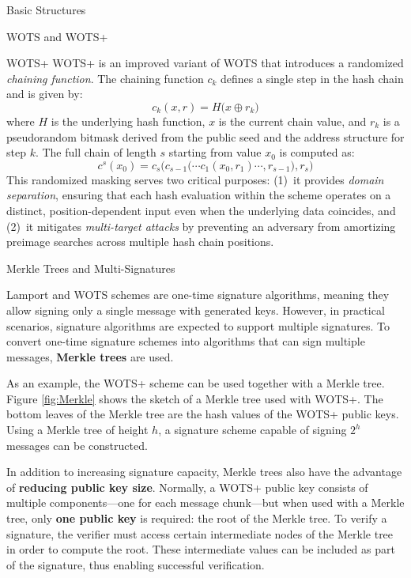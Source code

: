 \documentclass[version=preprint]{iacrcc}
\begin{document}
\begin{section}{Basic Structures}{\label{sec1}}
\begin{subsection}{WOTS and WOTS+}
\begin{subsubsection}{WOTS+ \cite{cryptoeprint:2017/965}}
        WOTS+ is an improved variant of WOTS that introduces a randomized \emph{chaining function}. The chaining function $c_k$ defines a single step in the hash chain and is given by:
        \[
        c_k(x, r) = H\bigl(x \oplus r_k\bigr)
        \]
        where $H$ is the underlying hash function, $x$ is the current chain value, and $r_k$ is a pseudorandom bitmask derived from the public seed and the address structure for step $k$. The full chain of length $s$ starting from value $x_0$ is computed as:
        \[
        c^s(x_0) = c_s\bigl(c_{s-1}\bigl(\cdots c_1(x_0, r_1)\cdots, r_{s-1}\bigr), r_s\bigr)
        \]
        This randomized masking serves two critical purposes: (1)~it provides \emph{domain separation}, ensuring that each hash evaluation within the scheme operates on a distinct, position-dependent input even when the underlying data coincides, and (2)~it mitigates \emph{multi-target attacks} by preventing an adversary from amortizing preimage searches across multiple hash chain positions.
        
    \end{subsubsection}
    
    
\end{subsection}


\begin{subsection}{Merkle Trees and Multi-Signatures}

Lamport and WOTS schemes are one-time signature algorithms, meaning they allow signing only a single message with generated keys. However, in practical scenarios, signature algorithms are expected to support multiple signatures. To convert one-time signature schemes into algorithms that can sign multiple messages, \textbf{Merkle trees} are used.

As an example, the WOTS+ scheme can be used together with a Merkle tree. Figure \ref{fig:Merkle} shows the sketch of a Merkle tree used with WOTS+. The bottom leaves of the Merkle tree are the hash values of the WOTS+ public keys. Using a Merkle tree of height \( h \), a signature scheme capable of signing \( 2^h \) messages can be constructed.

In addition to increasing signature capacity, Merkle trees also have the advantage of \textbf{reducing public key size}. Normally, a WOTS+ public key consists of multiple components—one for each message chunk—but when used with a Merkle tree, only \textbf{one public key} is required: the root of the Merkle tree. To verify a signature, the verifier must access certain intermediate nodes of the Merkle tree in order to compute the root. These intermediate values can be included as part of the signature, thus enabling successful verification.


\end{subsection}
\end{section}
\end{document}
